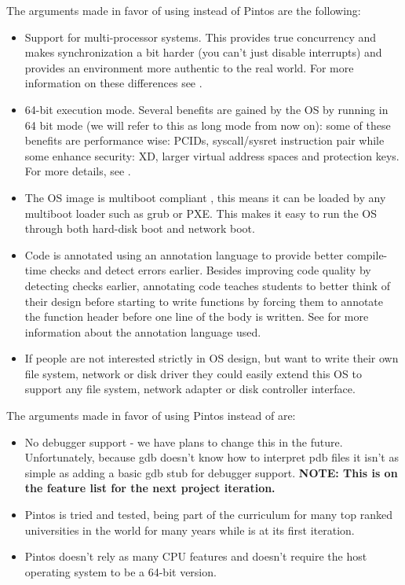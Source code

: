 The arguments made in favor of using \projectname instead of Pintos are the following:
\begin{itemize}
	\item Support for multi-processor systems. This provides true concurrency and makes
synchronization a bit harder (you can't just disable interrupts) and provides an environment more
authentic to the real world. For more information on these differences see .

	\item 64-bit execution mode. Several benefits are gained by the OS by
running in 64 bit mode (we will refer to this as long mode from now on): some of these benefits are
performance wise: PCIDs, syscall/sysret instruction pair while some enhance security: XD, larger
virtual address spaces and protection keys. For more details, see .

	\item The OS image is multiboot compliant \cite{gnuMultiboot}, this means it can be loaded by
any multiboot loader such as grub or PXE. This makes it easy to run the OS through both hard-disk
boot and network boot.

	\item Code is annotated using an annotation language to provide better compile-time checks and
detect errors earlier. Besides improving code quality by detecting checks earlier, annotating code
teaches students to better think of their design before starting to write functions by forcing them
to annotate the function header before one line of the body is written. See \cite{msdnSAL} for more
 information about the annotation language used.

	\item If people are not interested strictly in OS design, but want to write their own file
system, network or disk driver they could easily extend this OS to support any file system, network
adapter or disk controller interface.

\end{itemize}

The arguments made in favor of using Pintos instead of \projectname are:

\begin{itemize}
	\item No debugger support - we have plans to change this in the future. Unfortunately, because
gdb doesn't know how to interpret pdb files it isn't as simple as adding a basic gdb stub for
debugger support. \textbf{NOTE: This is on the feature list for the next project iteration.}

	\item Pintos is tried and tested, being part of the curriculum for many top ranked universities
in the world for many years while \projectname is at its first iteration.

	\item Pintos doesn't rely as many CPU features and doesn't require the host operating system to
be a 64-bit version.


\end{itemize}

